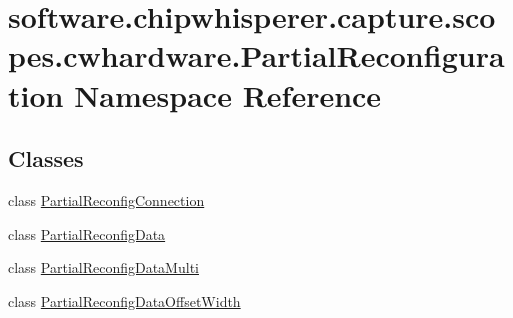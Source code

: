 \hypertarget{namespacesoftware_1_1chipwhisperer_1_1capture_1_1scopes_1_1cwhardware_1_1PartialReconfiguration}{}\section{software.\+chipwhisperer.\+capture.\+scopes.\+cwhardware.\+Partial\+Reconfiguration Namespace Reference}
\label{namespacesoftware_1_1chipwhisperer_1_1capture_1_1scopes_1_1cwhardware_1_1PartialReconfiguration}
\subsection*{Classes}
\begin{DoxyCompactItemize}
\item 
class \hyperlink{classsoftware_1_1chipwhisperer_1_1capture_1_1scopes_1_1cwhardware_1_1PartialReconfiguration_1_1PartialReconfigConnection}{Partial\+Reconfig\+Connection}
\item 
class \hyperlink{classsoftware_1_1chipwhisperer_1_1capture_1_1scopes_1_1cwhardware_1_1PartialReconfiguration_1_1PartialReconfigData}{Partial\+Reconfig\+Data}
\item 
class \hyperlink{classsoftware_1_1chipwhisperer_1_1capture_1_1scopes_1_1cwhardware_1_1PartialReconfiguration_1_1PartialReconfigDataMulti}{Partial\+Reconfig\+Data\+Multi}
\item 
class \hyperlink{classsoftware_1_1chipwhisperer_1_1capture_1_1scopes_1_1cwhardware_1_1PartialReconfiguration_1_1PartialReconfigDataOffsetWidth}{Partial\+Reconfig\+Data\+Offset\+Width}
\end{DoxyCompactItemize}
